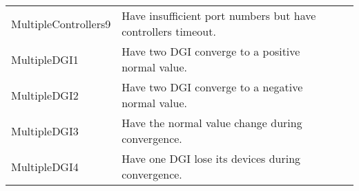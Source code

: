 \documentclass{article}
\begin{document}
\begin{center}
\begin{footnotesize}
\begin{longtable}{|p{3cm}|p{4cm}|p{8cm}|c|}
    MultipleControllers9 & Have insufficient port numbers but have controllers timeout. & & \\
    MultipleDGI1 & Have two DGI converge to a positive normal value. & & \\
    MultipleDGI2 & Have two DGI converge to a negative normal value. & & \\
    MultipleDGI3 & Have the normal value change during convergence. & & \\
    MultipleDGI4 & Have one DGI lose its devices during convergence. & & \\
\end{longtable}
\end{footnotesize}
\end{center}
\end{document}
